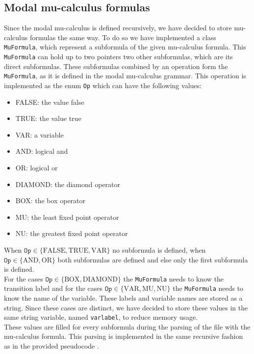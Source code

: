 \documentclass[10pt,a4paper]{article}
\begin{document}
\subsection{Modal mu-calculus formulas}
Since the modal mu-calculus is defined recursively, we have decided to store mu-calculus formulas the same way. To do so we have implemented a class \texttt{MuFormula}, which represent a subformula of the given mu-calculus formula. This \texttt{MuFormula} can hold up to two pointers two other subformulas, which are its direct subformulas. These subformulas combined by an operation form the \texttt{MuFormula}, as it is defined in the modal mu-calculus grammar. This operation is implemented as the enum \texttt{Op} which can have the following values:

\begin{itemize}
\item FALSE: the value false
\item TRUE: the value true
\item VAR: a variable
\item AND: logical and
\item OR: logical or
\item DIAMOND: the diamond operator
\item BOX: the box operator
\item MU: the least fixed point operator
\item NU: the greatest fixed point operator
\end{itemize}

\noindent When $\texttt{Op} \in \{\text{FALSE}, \text{TRUE}, \text{VAR}\}$ no subformula is defined, when $\texttt{Op} \in \{\text{AND}, \text{OR}\}$ both subformulas are defined and else only the first subformula is defined. \\
For the cases $\texttt{Op} \in \{\text{BOX}, \text{DIAMOND}\}$ the \texttt{MuFormula} needs to know the transition label and for the cases $\texttt{Op} \in \{\text{VAR}, \text{MU}, \text{NU}\}$ the \texttt{MuFormula} needs to know the name of the variable. These labels and variable names are stored as a string. Since these cases are distinct, we have decided to store these values in the same string variable, named \texttt{varlabel}, to reduce memory usage.\\
These values are filled for every subformula during the parsing of the file with the mu-calculus formula. This parsing is implemented in the same recursive fashion as in the provided pseudocode \cite{muparse}.
\end{document}
